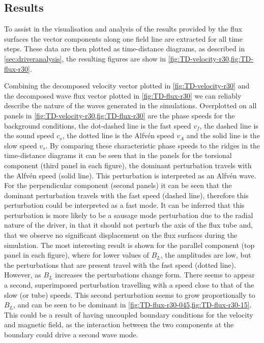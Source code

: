 \subsection{Results}\label{subsec:expfac-results}

To assist in the visualisation and analysis of the results provided by the flux surfaces the vector components along one field line are extracted for all time steps.
These data are then plotted as time-distance diagrams, as described in \cref{sec:driveranalysis}, the resulting figures are show in \cref{fig:TD-velocity-r30,fig:TD-flux-r30}.

Combining the decomposed velocity vector plotted in \cref{fig:TD-velocity-r30} and the decomposed wave flux vector plotted in \cref{fig:TD-flux-r30} we can reliably describe the nature of the waves generated in the simulations.
Overplotted on all panels in \cref{fig:TD-velocity-r30,fig:TD-flux-r30} are the phase speeds for the background conditions, the dot-dashed line is the fast speed $v_f$, the dashed line is the sound speed $c_s$, the dotted line is the Alfv\'en speed $v_A$ and the solid line is the slow speed $v_s$.
By comparing these characteristic phase speeds to the ridges in the time-distance diagrams it can be seen that in the panels for the torsional component (third panel in each figure), the dominant perturbation travels with the Alfv\'en speed (solid line).
This perturbation is interpreted as an Alfv\'en wave.
For the perpendicular component (second panels) it can be seen that the dominant perturbation travels with the fast speed (dashed line), therefore this perturbation could be interpreted as a fast mode.
It can be inferred that this perturbation is more likely to be a sausage mode perturbation due to the radial nature of the driver, in that it should not perturb the axis of the flux tube and, that we observe no significant displacement on the flux surfaces during the simulation.
The most interesting result is shown for the parallel component (top panel in each figure), where for lower values of $B_L$, the amplitudes are low, but the perturbations that are present travel with the fast speed (dotted line).
However, as $B_L$ increases the perturbations change form.
There seems to appear a second, superimposed perturbation travelling with a speed close to that of the slow (or tube) speeds.
This second perturbation seems to grow proportionally to $B_L$, and can be seen to be dominant in \cref{fig:TD-flux-r30-045,fig:TD-flux-r30-15}.
This could be a result of having uncoupled boundary conditions for the velocity and magnetic field, as the interaction between the two components at the boundary could drive a second wave mode.

